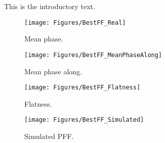 
This is the introductory text.



\begin{figure}
  \centering
  \texttt{[image: Figures/BestFF\_Real]}
  \caption{Mean phase.}
  \label{f:BestFF_Real}
\end{figure}

\begin{figure}
  \centering
  \texttt{[image: Figures/BestFF\_MeanPhaseAlong]}
  \caption{Mean phase along.}
  \label{f:BestFF_MeanPhaseAlong}
\end{figure}

\begin{figure}
  \centering
  \texttt{[image: Figures/BestFF\_Flatness]}
  \caption{Flatness.}
  \label{f:BestFF_Flatness}
\end{figure}


\begin{figure}
  \centering
  \texttt{[image: Figures/BestFF\_Simulated]}
  \caption{Simulated PFF.}
  \label{f:BestFF_Simulated}
\end{figure}








